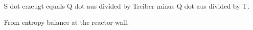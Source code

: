 S dot erzeugt equals Q dot aus divided by Treiber minus Q dot aus divided by T.

From entropy balance at the reactor wall.
